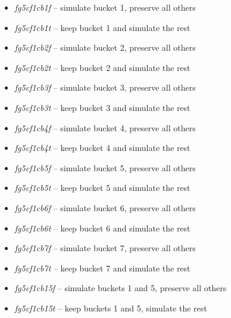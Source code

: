 \documentclass[10pt,oneside]{memoir}
\begin{document}
\begin{Spacing}{2}
\begin{itemize}
\item {\itshape fg5cf1c{\itshape {\itshape b1f}}} -- simulate bucket 1, preserve all others

\item {\itshape fg5cf1c{\itshape {\itshape b1t}}} -- keep bucket 1 and simulate the rest

\item {\itshape fg5cf1c{\itshape {\itshape b2f}}} -- simulate bucket 2, preserve all others

\item {\itshape fg5cf1c{\itshape {\itshape b2t}}} -- keep bucket 2 and simulate the rest

\item {\itshape fg5cf1c{\itshape {\itshape b3f}}} -- simulate bucket 3, preserve all others

\item {\itshape fg5cf1c{\itshape {\itshape b3t}}} -- keep bucket 3 and simulate the rest

\item {\itshape fg5cf1c{\itshape {\itshape b4f}}} -- simulate bucket 4, preserve all others

\item {\itshape fg5cf1c{\itshape {\itshape b4t}}} -- keep bucket 4 and simulate the rest

\item {\itshape fg5cf1c{\itshape {\itshape b5f}}} -- simulate bucket 5, preserve all others

\item {\itshape fg5cf1c{\itshape {\itshape b5t}}} -- keep bucket 5 and simulate the rest

\item {\itshape fg5cf1c{\itshape {\itshape b6f}}} -- simulate bucket 6, preserve all others

\item {\itshape fg5cf1c{\itshape {\itshape b6t}}} -- keep bucket 6 and simulate the rest

\item {\itshape fg5cf1c{\itshape {\itshape b7f}}} -- simulate bucket 7, preserve all others

\item {\itshape fg5cf1c{\itshape {\itshape b7t}}} -- keep bucket 7 and simulate the rest

\item {\itshape fg5cf1c{\itshape {\itshape b15f}}} -- simulate buckets 1 and 5, preserve all others

\item {\itshape fg5cf1c{\itshape {\itshape b15t}}} -- keep buckets 1 and 5, simulate the rest


\end{itemize}
\end{Spacing}
\end{document}
